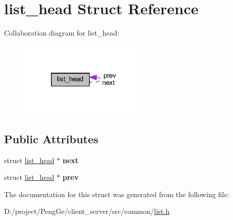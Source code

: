 \hypertarget{structlist__head}{}\section{list\+\_\+head Struct Reference}
\label{structlist__head}


Collaboration diagram for list\+\_\+head\+:
\nopagebreak
\begin{figure}[H]
\begin{center}
\leavevmode
\includegraphics[width=175pt]{structlist__head__coll__graph}
\end{center}
\end{figure}
\subsection*{Public Attributes}
\begin{DoxyCompactItemize}
\item 
\hypertarget{structlist__head_ac3b0ff0dfb978a0cfbdad6b9d19cdcfe}{}struct \hyperlink{structlist__head}{list\+\_\+head} $\ast$ {\bfseries next}\label{structlist__head_ac3b0ff0dfb978a0cfbdad6b9d19cdcfe}

\item 
\hypertarget{structlist__head_aaa0eabda8877e1d6de73a33f223ad004}{}struct \hyperlink{structlist__head}{list\+\_\+head} $\ast$ {\bfseries prev}\label{structlist__head_aaa0eabda8877e1d6de73a33f223ad004}

\end{DoxyCompactItemize}


The documentation for this struct was generated from the following file\+:\begin{DoxyCompactItemize}
\item 
D\+:/project/\+Peng\+Ge/client\+\_\+server/src/common/\hyperlink{list_8h}{list.\+h}\end{DoxyCompactItemize}
